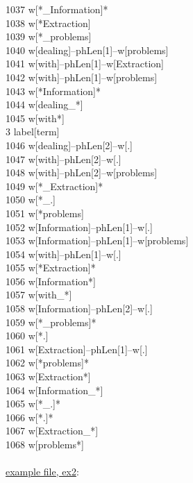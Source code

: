 \documentclass[11pt]{article}
\begin{document}
{1037    w[*\_Information]* \\
1038    w[*Extraction] \\
1039    w[*\_problems] \\
1040    w[dealing]--phLen[1]--w[problems] \\
1041    w[with]--phLen[1]--w[Extraction] \\
1042    w[with]--phLen[1]--w[problems] \\
1043    w[*Information]* \\
1044    w[dealing\_*] \\
1045    w[with*] \\
3       label[term] \\
1046    w[dealing]--phLen[2]--w[.] \\
1047    w[with]--phLen[2]--w[.] \\
1048    w[with]--phLen[2]--w[problems] \\
1049    w[*\_Extraction]* \\
1050    w[*\_.] \\
1051    w[*problems] \\
1052    w[Information]--phLen[1]--w[.] \\
1053    w[Information]--phLen[1]--w[problems] \\
1054    w[with]--phLen[1]--w[.] \\
1055    w[*Extraction]* \\
1056    w[Information*] \\
1057    w[with\_*] \\
1058    w[Information]--phLen[2]--w[.] \\
1059    w[*\_problems]* \\
1060    w[*.] \\
1061    w[Extraction]--phLen[1]--w[.] \\
1062    w[*problems]* \\
1063    w[Extraction*] \\
1064    w[Information\_*] \\
1065    w[*\_.]* \\
1066    w[*.]* \\
1067    w[Extraction\_*] \\
1068    w[problems*]} \\ \\ 
%
\underline{example file, ex2}: \\ \\
%
\end{document}
